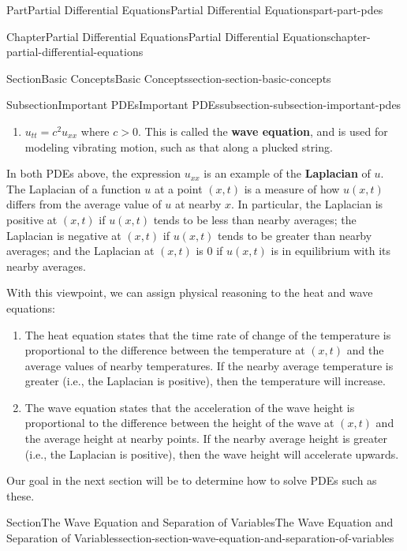 \documentclass[twoside,10pt,]{book}
\newcommand{\terminology}[1]{\textbf{#1}}
\numberwithin{equation}{part}
\newcommand{\gt}{>}
\begin{document}
\begin{partptx}{Part}{Partial Differential Equations}{}{Partial Differential Equations}{}{}{part-part-pdes}
\begin{chapterptx}{Chapter}{Partial Differential Equations}{}{Partial Differential Equations}{}{}{chapter-partial-differential-equations}
\begin{sectionptx}{Section}{Basic Concepts}{}{Basic Concepts}{}{}{section-section-basic-concepts}
\begin{subsectionptx}{Subsection}{Important PDEs}{}{Important PDEs}{}{}{subsection-subsection-important-pdes}
\begin{enumerate}
\item{}\(u_{tt} = c^{2}u_{xx}\) where \(c\gt0\). This is called the \terminology{wave equation}, and is used for modeling vibrating motion, such as that along a plucked string.%
\end{enumerate}
In both PDEs above, the expression \(u_{xx}\) is an example of the \terminology{Laplacian} of \(u\). The Laplacian of a function \(u\) at a point \((x,t)\) is a measure of how \(u(x,t)\) differs from the average value of \(u\) at nearby \(x\). In particular, the Laplacian is positive at \((x,t)\) if \(u(x,t)\) tends to be less than nearby averages; the Laplacian is negative at \((x,t)\) if \(u(x,t)\) tends to be greater than nearby averages; and the Laplacian at \((x,t)\) is \(0\) if \(u(x,t)\) is in equilibrium with its nearby averages.%
\par
With this viewpoint, we can assign physical reasoning to the heat and wave equations:%
\begin{enumerate}
\item{}The heat equation states that the time rate of change of the temperature is proportional to the difference between the temperature at \((x,t)\) and the average values of nearby temperatures. If the nearby average temperature is greater (i.e., the Laplacian is positive), then the temperature will increase.%
\item{}The wave equation states that the acceleration of the wave height is proportional to the difference between the height of the wave at \((x,t)\) and the average height at nearby points. If the nearby average height is greater (i.e., the Laplacian is positive), then the wave height will accelerate upwards.%
\end{enumerate}
%
\par
Our goal in the next section will be to determine how to solve PDEs such as these.%
\end{subsectionptx}
\end{sectionptx}
%
%
\typeout{************************************************}
\typeout{************************************************}
%
\begin{sectionptx}{Section}{The Wave Equation and Separation of Variables}{}{The Wave Equation and Separation of Variables}{}{}{section-section-wave-equation-and-separation-of-variables}

\end{sectionptx}
\end{chapterptx}
\end{partptx}
\end{document}
